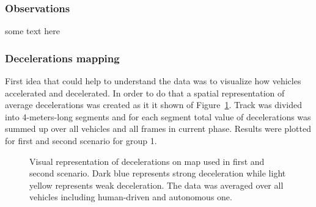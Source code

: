 \documentclass[11pt,english]{article}
\begin{document}
\subsubsection{Observations}

some text here


\subsubsection*{Decelerations mapping}

First idea that could help to understand the data was to visualize how vehicles accelerated and decelerated. In order to do that a spatial representation of average decelerations was created as it it shown of Figure~\ref{fig:decelerations1}. Track was divided into 4-meters-long segments and for each segment total value of decelerations was summed up over all vehicles and all frames in current phase. Results were plotted for first and second scenario for group 1.


\begin{figure}[h]
\centering
{}


\caption{Visual representation of decelerations on map used in first and second scenario. Dark blue represents strong deceleration while light yellow represents weak deceleration. The data was averaged over all vehicles including human-driven and autonomous one.}
\label{fig:decelerations1}
\end{figure}
\end{document}
